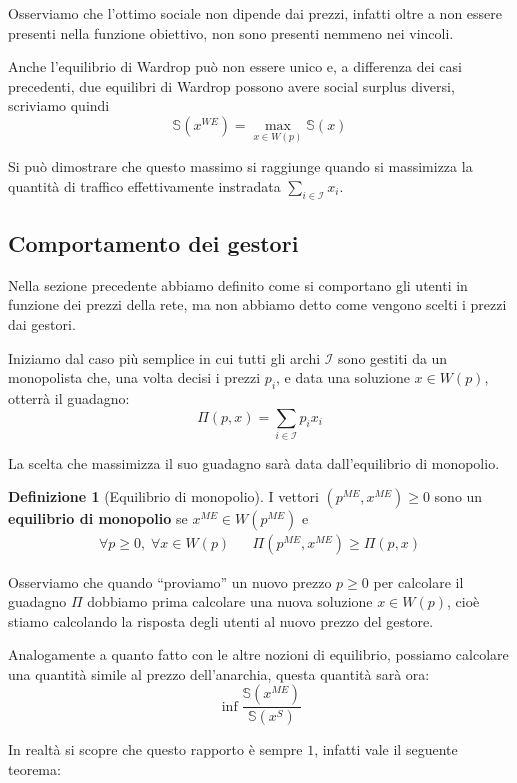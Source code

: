 \documentclass[a4paper]{article}
\theoremstyle{plain}
\theoremstyle{definition}
\newtheorem{mydef}[myteo]{Definizione}
\theoremstyle{remark}
\newcommand{\pa}[1]{\left(#1\right)}
\begin{document}
Osserviamo che l'ottimo sociale non dipende dai prezzi, infatti oltre
a non essere presenti nella funzione obiettivo, non sono presenti
nemmeno nei vincoli.

Anche l'equilibrio di Wardrop può non essere unico e, a differenza dei
casi precedenti, due equilibri di Wardrop possono avere social surplus
diversi, scriviamo quindi
\[ \mathbb{S}\pa{x^{WE}} = \max _{x\in W(p)} \mathbb{S}\pa{x} \]

Si può dimostrare che questo massimo si raggiunge quando si massimizza
la quantità di traffico effettivamente instradata $\sum _{i\in
  \mathcal{I}} x_i$.

\subsection{Comportamento dei gestori}
\label{sec:prezzi-gestori}

Nella sezione precedente abbiamo definito come si comportano gli
utenti in funzione dei prezzi della rete, ma non abbiamo detto come
vengono scelti i prezzi dai gestori.

Iniziamo dal caso più semplice in cui tutti gli archi $\mathcal{I}$
sono gestiti da un monopolista che, una volta decisi i prezzi $p_i$, e
data una soluzione $x\in W(p)$, otterrà il guadagno:
\[ \Pi (p,x) = \sum _{i\in\mathcal{I}} p_i x_i \]

La scelta che massimizza il suo guadagno sarà data dall'equilibrio di
monopolio.
\begin{mydef}[Equilibrio di monopolio]
  I vettori $\pa{p^{ME},x^{ME}}\ge 0$ sono un \textbf{equilibrio di
    monopolio} se $x^{ME}\in W(p^{ME})$ e 
  \begin{align*}
    \forall p\ge 0,\; \forall x\in W(p) && \Pi \pa{p^{ME},x^{ME}}
                                           \ge \Pi \pa{p,x}
  \end{align*}
\end{mydef}

Osserviamo che quando ``proviamo'' un nuovo prezzo $p\ge 0$ per
calcolare il guadagno $\Pi$ dobbiamo prima calcolare una nuova
soluzione $x\in W\pa{p}$, cioè stiamo calcolando la risposta degli
utenti al nuovo prezzo del gestore.

Analogamente a quanto fatto con le altre nozioni di equilibrio,
possiamo calcolare una quantità simile al prezzo dell'anarchia, questa
quantità sarà ora:
\[ \inf \frac{\mathbb{S}\pa{x^{ME}}}{\mathbb{S}\pa{x^S}} \]

In realtà si scopre che questo rapporto è sempre $1$, infatti vale
il seguente teorema:
\end{document}
